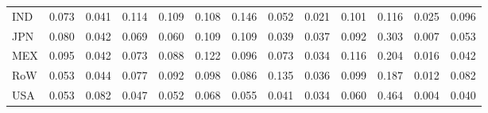 \begin{table}[htbp]
\begin{tabular}{lcccccccccccc}
  IND & \textcolor[RGB]{113,73,142}{0.073} & \textcolor[RGB]{195,126,60}{0.041} & \textcolor[RGB]{38,25,217}{0.114} & \textcolor[RGB]{49,32,206}{0.109} & \textcolor[RGB]{51,33,204}{0.108} & \textcolor[RGB]{21,14,234}{0.146} & \textcolor[RGB]{166,107,89}{0.052} & \textcolor[RGB]{234,151,21}{0.021} & \textcolor[RGB]{59,38,196}{0.101} & \textcolor[RGB]{34,22,221}{0.116} & \textcolor[RGB]{232,150,23}{0.025} & \textcolor[RGB]{70,45,185}{0.096} \\ 
  JPN & \textcolor[RGB]{98,63,157}{0.080} & \textcolor[RGB]{187,121,68}{0.042} & \textcolor[RGB]{123,80,132}{0.069} & \textcolor[RGB]{138,89,117}{0.060} & \textcolor[RGB]{42,27,212}{0.109} & \textcolor[RGB]{47,30,208}{0.109} & \textcolor[RGB]{204,132,51}{0.039} & \textcolor[RGB]{210,136,45}{0.037} & \textcolor[RGB]{81,52,174}{0.092} & \textcolor[RGB]{6,4,249}{0.303} & \textcolor[RGB]{246,160,8}{0.007} & \textcolor[RGB]{159,103,96}{0.053} \\ 
  MEX & \textcolor[RGB]{77,50,178}{0.095} & \textcolor[RGB]{193,125,62}{0.042} & \textcolor[RGB]{115,74,140}{0.073} & \textcolor[RGB]{85,55,170}{0.088} & \textcolor[RGB]{30,19,225}{0.122} & \textcolor[RGB]{72,47,183}{0.096} & \textcolor[RGB]{119,77,136}{0.073} & \textcolor[RGB]{217,140,38}{0.034} & \textcolor[RGB]{36,23,219}{0.116} & \textcolor[RGB]{13,8,242}{0.204} & \textcolor[RGB]{236,153,19}{0.016} & \textcolor[RGB]{191,124,64}{0.042} \\ 
  RoW & \textcolor[RGB]{157,102,98}{0.053} & \textcolor[RGB]{181,117,74}{0.044} & \textcolor[RGB]{106,69,149}{0.077} & \textcolor[RGB]{79,51,176}{0.092} & \textcolor[RGB]{66,43,189}{0.098} & \textcolor[RGB]{87,56,168}{0.086} & \textcolor[RGB]{25,16,230}{0.135} & \textcolor[RGB]{212,138,42}{0.036} & \textcolor[RGB]{64,41,191}{0.099} & \textcolor[RGB]{15,10,240}{0.187} & \textcolor[RGB]{242,157,13}{0.012} & \textcolor[RGB]{96,62,159}{0.082} \\ 
  USA & \textcolor[RGB]{155,100,100}{0.053} & \textcolor[RGB]{91,59,164}{0.082} & \textcolor[RGB]{172,111,83}{0.047} & \textcolor[RGB]{162,104,94}{0.052} & \textcolor[RGB]{125,81,130}{0.068} & \textcolor[RGB]{149,96,106}{0.055} & \textcolor[RGB]{198,128,57}{0.041} & \textcolor[RGB]{219,142,36}{0.034} & \textcolor[RGB]{136,88,119}{0.060} & \textcolor[RGB]{0,0,255}{0.464} & \textcolor[RGB]{251,162,4}{0.004} & \textcolor[RGB]{202,131,53}{0.040} \\ 
   \hline
\end{tabular}
\end{table}

